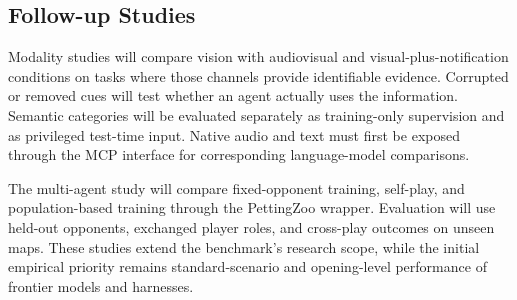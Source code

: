 \subsection{Follow-up Studies}
Modality studies will compare vision with audiovisual and visual-plus-notification conditions on tasks where those channels provide identifiable evidence. Corrupted or removed cues will test whether an agent actually uses the information. Semantic categories will be evaluated separately as training-only supervision and as privileged test-time input. Native audio and text must first be exposed through the MCP interface for corresponding language-model comparisons.

The multi-agent study will compare fixed-opponent training, self-play, and population-based training through the PettingZoo wrapper. Evaluation will use held-out opponents, exchanged player roles, and cross-play outcomes on unseen maps. These studies extend the benchmark's research scope, while the initial empirical priority remains standard-scenario and opening-level performance of frontier models and harnesses.
